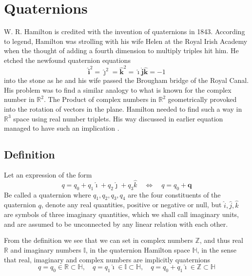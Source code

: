 \section{Quaternions}
W. R. Hamilton \cite{hamilton1848xi} is credited with the invention of quaternions in 1843. According to legend, Hamilton was strolling with his wife Helen at the Royal Irish Academy when the thought of adding a fourth dimension to multiply triples hit him. He etched the newfound quaternion equations 
\begin{equation}
    \hat{\boldsymbol{i}}^{2}=\hat{\boldsymbol{\jmath}}^{2}=\hat{\boldsymbol{k}}^{2}=\hat{\boldsymbol{\imath}}\hat{\boldsymbol{j}} \hat{\boldsymbol{k}}=-1
\end{equation}
into the stone as he and his wife passed the Brougham bridge of the Royal Canal.
His problem was to find a similar analogy to what is known for the complex number in $\mathbb{R}^2$. The Product of complex numbers in $\mathbb{R}^2$ geometrically provoked into the rotation of vectors in the plane. Hamilton needed to find such a way in $\mathbb{R}^3$ space using real number triplets. His way discussed in earlier equation managed to have such an implication \cite{kuipers1999quaternions}. 

\subsection{Definition}
Let an expression of the form
\begin{equation}\label{q_quat}
    q=q_{0}+q_{1} \hat{\imath}+q_{2} \hat{\jmath}+q_{3} \hat{k} \quad \Leftrightarrow \quad q=q_{0}+\boldsymbol{q}
\end{equation}
Be called a quaternion where  $q_1,q_2,q_3,q_4$ are the four constituents of the quaternion $q$, denote any real quantities, positive or negative or null, but $\hat{i}, \hat{j}, \hat{k}$ are symbols of three imaginary quantities, which we shall call imaginary units, and are assumed to be unconnected by any linear relation with each other.

From the definition we see that we can set in complex numbers $\mathbb{Z}$, and thus real $\mathbb{R}$ and imaginary numbers $\mathbb{I}$, in the quaternion Hamilton space $\mathbb{H}$, in the sense that real, imaginary and complex numbers are implicitly quaternions
\begin{equation}
q=q_{0} \in \mathbb{R} \subset \mathbb{H}, \quad q=q_{1} \hat{\imath} \in \mathbb{I} \subset \mathbb{H}, \quad q=q_{0}+q_{1} \hat{\imath} \in \mathbb{Z} \subset \mathbb{H}
\end{equation}

